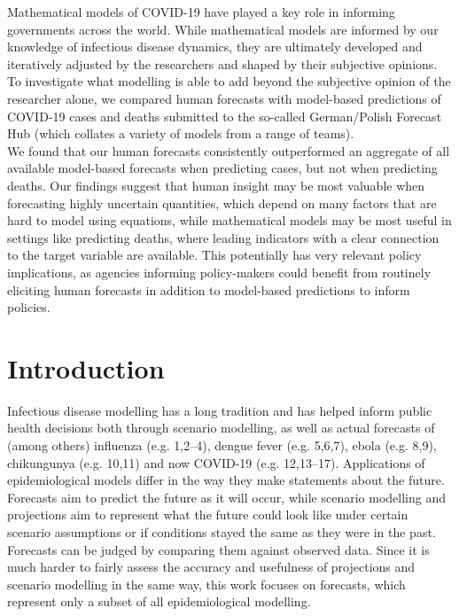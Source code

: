 \documentclass[
]{article}
\begin{document}
Mathematical models of COVID-19 have played a key role in informing governments across the world. While mathematical models are informed by our knowledge of infectious disease dynamics, they are ultimately developed and iteratively adjusted by the researchers and shaped by their subjective opinions. To investigate what modelling is able to add beyond the subjective opinion of the researcher alone, we compared human forecasts with model-based predictions of COVID-19 cases and deaths submitted to the so-called German/Polish Forecast Hub (which collates a variety of models from a range of teams).\\
We found that our human forecasts consistently outperformed an aggregate of all available model-based forecasts when predicting cases, but not when predicting deaths. Our findings suggest that human insight may be most valuable when forecasting highly uncertain quantities, which depend on many factors that are hard to model using equations, while mathematical models may be most useful in settings like predicting deaths, where leading indicators with a clear connection to the target variable are available. This potentially has very relevant policy implications, as agencies informing policy-makers could benefit from routinely eliciting human forecasts in addition to model-based predictions to inform policies.

\hypertarget{introduction}{%
\section{Introduction}\label{introduction}}

Infectious disease modelling has a long tradition and has helped inform public health decisions both through scenario modelling, as well as actual forecasts of (among others) influenza (e.g. 1,2--4), dengue fever (e.g. 5,6,7), ebola (e.g. 8,9), chikungunya (e.g. 10,11) and now COVID-19 (e.g. 12,13--17). Applications of epidemiological models differ in the way they make statements about the future. Forecasts aim to predict the future as it will occur, while scenario modelling and projections aim to represent what the future could look like under certain scenario assumptions or if conditions stayed the same as they were in the past. Forecasts can be judged by comparing them against observed data. Since it is much harder to fairly assess the accuracy and usefulness of projections and scenario modelling in the same way, this work focuses on forecasts, which represent only a subset of all epidemiological modelling.
\end{document}
